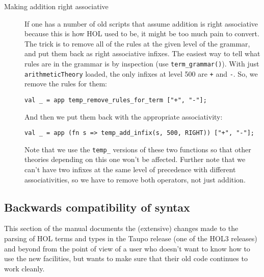 {\begin{description}
\item[Making addition right associative] If one has a number of old
  scripts that assume addition is right associative because this is
  how HOL used to be, it might be too much pain to convert.  The trick
  is to remove all of the rules at the given level of the grammar, and
  put them back as right associative infixes.  The easiest way to tell
  what rules are in the grammar is by inspection (use
  \texttt{term\_grammar()}).  With just \texttt{arithmeticTheory}
  loaded, the only infixes at level 500 are \texttt{+} and
  \texttt{-}.  So, we remove the rules for them:
  \begin{verbatim}
val _ = app temp_remove_rules_for_term ["+", "-"];
\end{verbatim}
  \noindent And then we put them back with the appropriate
  associativity:
\begin{verbatim}
val _ = app (fn s => temp_add_infix(s, 500, RIGHT)) ["+", "-"];
\end{verbatim}
\noindent Note that we use the \texttt{temp\_} versions of these two
functions so that other theories depending on this one won't be
affected.  Further note that we can't have two infixes at the same
level of precedence with different associativities, so we have to
remove both operators, not just addition.

\end{description}

}

\subsection{Backwards compatibility of syntax}

This section of the manual documents the (extensive) changes made to
the parsing of HOL terms and types in the Taupo release (one of the
HOL3 releases) and beyond from the point of view of a user who doesn't
want to know how to use the new facilities, but wants to make sure
that their old code continues to work cleanly.

